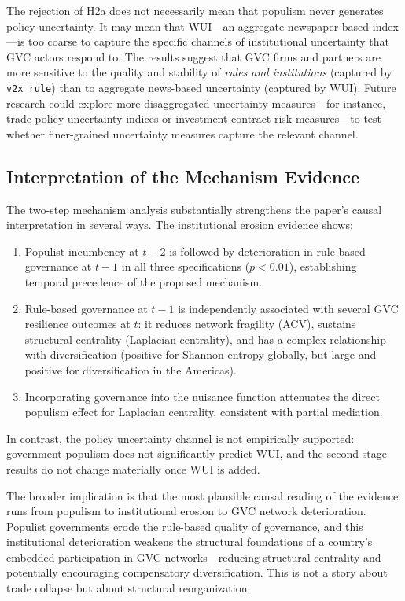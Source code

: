 \documentclass[12pt]{article}
\begin{document}
The rejection of H2a does not necessarily mean that populism never generates policy uncertainty. It may mean that WUI---an aggregate newspaper-based index---is too coarse to capture the specific channels of institutional uncertainty that GVC actors respond to. The results suggest that GVC firms and partners are more sensitive to the quality and stability of \textit{rules and institutions} (captured by \texttt{v2x\_rule}) than to aggregate news-based uncertainty (captured by WUI). Future research could explore more disaggregated uncertainty measures---for instance, trade-policy uncertainty indices or investment-contract risk measures---to test whether finer-grained uncertainty measures capture the relevant channel.



\subsection{Interpretation of the Mechanism Evidence}

The two-step mechanism analysis substantially strengthens the paper's causal interpretation in several ways. The institutional erosion evidence shows:

\begin{enumerate}
  \item Populist incumbency at $t-2$ is followed by deterioration in rule-based governance at $t-1$ in all three specifications ($p < 0.01$), establishing temporal precedence of the proposed mechanism.
  \item Rule-based governance at $t-1$ is independently associated with several GVC resilience outcomes at $t$: it reduces network fragility (ACV), sustains structural centrality (Laplacian centrality), and has a complex relationship with diversification (positive for Shannon entropy globally, but large and positive for diversification in the Americas).
  \item Incorporating governance into the nuisance function attenuates the direct populism effect for Laplacian centrality, consistent with partial mediation.
\end{enumerate}

In contrast, the policy uncertainty channel is not empirically supported: government populism does not significantly predict WUI, and the second-stage results do not change materially once WUI is added.

The broader implication is that the most plausible causal reading of the evidence runs from populism to institutional erosion to GVC network deterioration. Populist governments erode the rule-based quality of governance, and this institutional deterioration weakens the structural foundations of a country's embedded participation in GVC networks---reducing structural centrality and potentially encouraging compensatory diversification. This is not a story about trade collapse but about structural reorganization.
\end{document}
